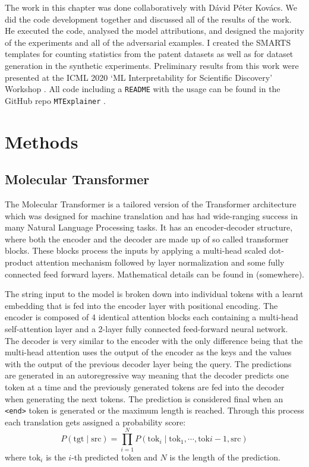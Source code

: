 The work in this chapter was done collaboratively with D\'{a}vid P\'{e}ter Kov\'{a}cs. We did the code development together and discussed all of the results of the work. He executed the code, analysed the model attributions, and designed the majority of the experiments and all of the adversarial examples. I created the SMARTS templates for counting statistics from the patent datasets as well as for dataset generation in the synthetic experiments. Preliminary results from this work were presented at the ICML 2020 `ML Interpretability for Scientific Discovery' Workshop \cite{Kovacs20unpack}. All code including a \texttt{README} with the usage can be found in the GitHub repo \texttt{MTExplainer} \cite{Kovacs2020MolecularExplainer}.

\section{Methods}

\subsection{Molecular Transformer}
The Molecular Transformer \cite{Schwaller2019MolecularPrediction} is a tailored version of the Transformer architecture \cite{Vaswani2017} which was designed for machine translation and has had wide-ranging success in many Natural Language Processing tasks. It has an encoder-decoder structure, where both the encoder and the decoder are made up of so called transformer blocks. These blocks process the inputs by applying a multi-head scaled dot-product attention mechanism followed by layer normalization and some fully connected feed forward layers. Mathematical details can be found in (somewhere).

The string input to the model is broken down into individual tokens with a learnt embedding that is fed into the encoder layer with positional encoding. The encoder is composed of 4 identical attention blocks each containing a multi-head self-attention layer and a 2-layer fully connected feed-forward neural network. The decoder is very similar to the encoder with the only difference being that the multi-head attention uses the output of the encoder as the keys and the values with the output of the previous decoder layer being the query. The predictions are generated in an autoregressive way meaning that the decoder predicts one token at a time and the previously generated tokens are fed into the decoder when generating the next tokens. The prediction is considered final when an \texttt{<end>} token is generated or the maximum length is reached. Through this process each translation gets assigned a probability score:
\begin{equation}
    P(\textrm{tgt} \mid \textrm{src}) = \prod_{i=1}^N P(\textrm{tok}_i \mid \textrm{tok}_1, \cdots , \textrm{tok}{i-1}, \textrm{src}) 
\end{equation}
where $\textrm{tok}_i$ is the $i$-th predicted token and $N$ is the length of the prediction.

